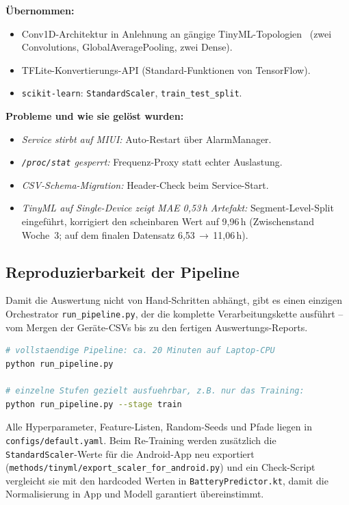 \documentclass[12pt, a4paper, ngerman]{article}
\newcommand{\code}[1]{\texttt{#1}}
\newcommand{\datei}[1]{\texttt{\small #1}}
\begin{document}
\textbf{Übernommen:}

\begin{itemize}
\item Conv1D-Architektur in Anlehnung an gängige
  TinyML-Topologien~\cite{alajlan2022tinyml,banbury2021mlperf}
  (zwei Convolutions, GlobalAveragePooling, zwei Dense).
\item TFLite-Konvertierungs-API (Standard-Funktionen von TensorFlow).
\item \code{scikit-learn}: \code{StandardScaler},
  \code{train\_test\_split}.
\end{itemize}

\textbf{Probleme und wie sie gelöst wurden:}

\begin{itemize}
\item \emph{Service stirbt auf MIUI:} Auto-Restart über AlarmManager.
\item \emph{\code{/proc/stat} gesperrt:} Frequenz-Proxy statt echter
  Auslastung.
\item \emph{CSV-Schema-Migration:} Header-Check beim Service-Start.
\item \emph{TinyML auf Single-Device zeigt MAE 0,53\,h Artefakt:}
  Segment-Level-Split eingeführt, korrigiert den scheinbaren Wert
  auf 9,96\,h (Zwischenstand Woche~3; auf dem finalen Datensatz
  6,53\,$\to$\,11,06\,h).
\end{itemize}

\subsection{Reproduzierbarkeit der Pipeline}

Damit die Auswertung nicht von Hand-Schritten abhängt, gibt es einen
einzigen Orchestrator \datei{run\_pipeline.py}, der die komplette
Verarbeitungskette ausführt -- vom Mergen der Geräte-CSVs bis zu den
fertigen Auswertungs-Reports.

\begin{lstlisting}[language=bash,caption={Pipeline reproduzierbar starten}]
# vollstaendige Pipeline: ca. 20 Minuten auf Laptop-CPU
python run_pipeline.py

# einzelne Stufen gezielt ausfuehrbar, z.B. nur das Training:
python run_pipeline.py --stage train
\end{lstlisting}

Alle Hyperparameter, Feature-Listen, Random-Seeds und Pfade liegen
in \datei{configs/default.yaml}. Beim Re-Training werden zusätzlich
die \code{StandardScaler}-Werte für die Android-App neu exportiert
(\datei{methods/tinyml/export\_scaler\_for\_android.py}) und ein
Check-Script vergleicht sie mit den hardcoded Werten in
\datei{BatteryPredictor.kt}, damit die Normalisierung in App und
Modell garantiert übereinstimmt.
\end{document}
